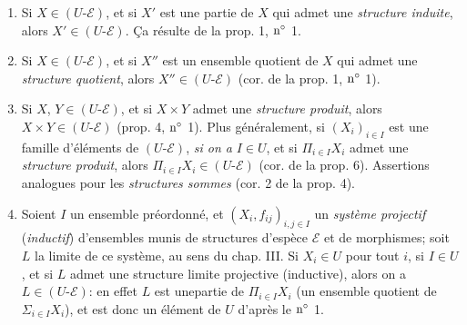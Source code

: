 \documentclass[10pt]{../fichiers-configuration-latex/smfart}
\def\labelenumi{(\theenumi)}
\begin{document}
\begin{enumerate}
\renewcommand{\theenumi}{\alph{enumi}}
\renewcommand{\labelenumi}{\theenumi)}
\item Si $X\in(U\text{-}\mathcal{E})$, et si $X'$ est une partie de $X$ qui
admet une \emph{structure induite}, alors $X'\in
(U\text{-}\mathcal{E})$. \c Ca résulte de la prop. 1, ${\rm
n^{\circ}}$ 1.

\item Si $X\in (U\text{-}\mathcal{E})$, et si $X''$ est un ensemble quotient de
$X$ qui admet une \emph{structure quotient}, alors $X''\in
(U\text{-}\mathcal{E})$ (cor. de la prop. 1, ${\rm n^{\circ}}$ 1).

\item Si $X$, $Y\in (U\text{-}\mathcal{E})$, et si $X\times Y$ admet une
\emph{structure produit}, alors $X\times Y\in
(U\text{-}\mathcal{E})$ (prop. 4, ${\rm n^{\circ}}$ 1). Plus
généralement, si $(X_i)_{i\in I}$ est une famille d'éléments de
$(U\text{-}\mathcal{E})$, \emph{si on a} $I\in U$, et si $\Pi_{i\in
I}X_i$ admet une \emph{structure produit}, alors $\Pi_{i\in I}X_i
\in (U\text{-}\mathcal{E})$ (cor. de la prop. 6). Assertions
analogues pour les \emph{structures sommes} (cor. 2 de la prop. 4).

\item Soient $I$ un ensemble préordonné, et $(X_i, f_{ij})_{i,j\in
I}$ un \emph{système projectif} (\resp \emph{inductif}) d'ensembles
munis de structures d'espèce $\mathcal{E}$ et de morphismes; soit
$L$ la limite de ce système, au sens du chap. III. Si $X_i\in U$
pour tout $i$, si $I\in U$, et si $L$ admet une structure limite
projective (\resp inductive), alors on a $L\in
(U\text{-}\mathcal{E})$: en effet $L$ est une\pageoriginale partie
de $\Pi_{i\in I}X_i$ (\resp un ensemble quotient de $\Sigma_{i\in
I}X_i$), et est donc un élément de $U$ d'après le ${\rm n^{\circ}}$
1.
\end{enumerate}
\end{document}
